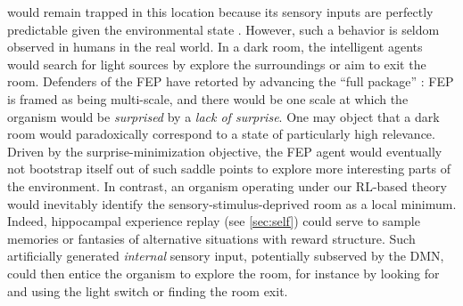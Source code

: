 \documentclass[10pt,letterpaper]{article}
\begin{document}
would remain trapped in this location
because its sensory inputs are perfectly predictable
given the environmental state \citep{darkroom2012}.
However, such a behavior is seldom observed in humans in the
real world. In a dark room, the intelligent agents would search for light sources by explore
the surroundings or aim to exit the room.
Defenders of the FEP have retorted by advancing the ``full package'' \citep{darkroom2012}:
FEP is framed as being multi-scale, and there would be one scale at which
the organism would
be \textit{surprised} by a \textit{lack of surprise}.
One may object that a dark room would paradoxically correspond to a state of particularly high relevance.
Driven by the surprise-minimization objective, the FEP agent would eventually not bootstrap itself out of such saddle points to explore more interesting parts of the environment.
In contrast, an organism operating under our RL-based theory would inevitably
identify the sensory-stimulus-deprived room as a local minimum. Indeed, hippocampal experience replay (see \ref{sec:self}) could serve to sample memories or fantasies of alternative situations
with reward structure. Such artificially generated \textit{internal} sensory input,
potentially subserved by the DMN, could then entice the organism to explore the room,
for instance by looking for and using the light switch or finding the room exit.
\end{document}
